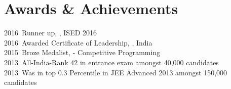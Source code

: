 \section{Awards \& Achievements}
2016\qquad~Runner up, , ISED 2016\\
2016\qquad~Awarded Certificate of Leadership, , India \\
2015\qquad~Broze Medalist,  - Competitive Programming \\
2013\qquad~All-India-Rank 42 in  entrance exam amongst 40,000 candidates\\
2013\qquad~Was in top 0.3 Percentile in JEE Advanced 2013 amongst 150,000 candidates\\
